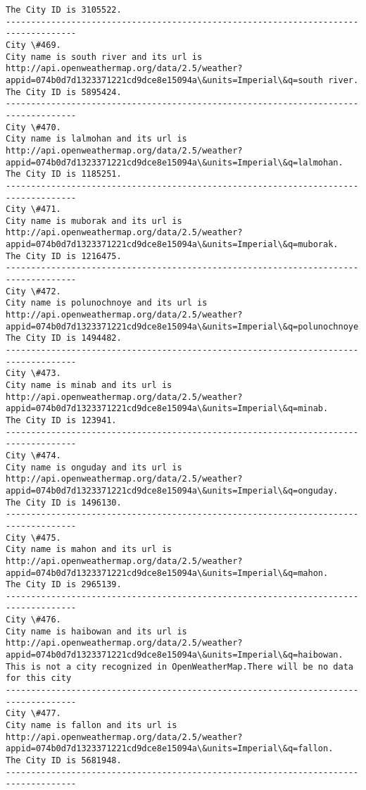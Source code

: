 \documentclass[11pt]{article}
\begin{document}
\begin{Verbatim}[commandchars=\\\{\}]
The City ID is 3105522.
------------------------------------------------------------------------------------
City \#469.
City name is south river and its url is http://api.openweathermap.org/data/2.5/weather?appid=074b0d7d1323371221cd9dce8e15094a\&units=Imperial\&q=south river.
The City ID is 5895424.
------------------------------------------------------------------------------------
City \#470.
City name is lalmohan and its url is http://api.openweathermap.org/data/2.5/weather?appid=074b0d7d1323371221cd9dce8e15094a\&units=Imperial\&q=lalmohan.
The City ID is 1185251.
------------------------------------------------------------------------------------
City \#471.
City name is muborak and its url is http://api.openweathermap.org/data/2.5/weather?appid=074b0d7d1323371221cd9dce8e15094a\&units=Imperial\&q=muborak.
The City ID is 1216475.
------------------------------------------------------------------------------------
City \#472.
City name is polunochnoye and its url is http://api.openweathermap.org/data/2.5/weather?appid=074b0d7d1323371221cd9dce8e15094a\&units=Imperial\&q=polunochnoye.
The City ID is 1494482.
------------------------------------------------------------------------------------
City \#473.
City name is minab and its url is http://api.openweathermap.org/data/2.5/weather?appid=074b0d7d1323371221cd9dce8e15094a\&units=Imperial\&q=minab.
The City ID is 123941.
------------------------------------------------------------------------------------
City \#474.
City name is onguday and its url is http://api.openweathermap.org/data/2.5/weather?appid=074b0d7d1323371221cd9dce8e15094a\&units=Imperial\&q=onguday.
The City ID is 1496130.
------------------------------------------------------------------------------------
City \#475.
City name is mahon and its url is http://api.openweathermap.org/data/2.5/weather?appid=074b0d7d1323371221cd9dce8e15094a\&units=Imperial\&q=mahon.
The City ID is 2965139.
------------------------------------------------------------------------------------
City \#476.
City name is haibowan and its url is http://api.openweathermap.org/data/2.5/weather?appid=074b0d7d1323371221cd9dce8e15094a\&units=Imperial\&q=haibowan.
This is not a city recognized in OpenWeatherMap.There will be no data for this city
------------------------------------------------------------------------------------
City \#477.
City name is fallon and its url is http://api.openweathermap.org/data/2.5/weather?appid=074b0d7d1323371221cd9dce8e15094a\&units=Imperial\&q=fallon.
The City ID is 5681948.
------------------------------------------------------------------------------------

\end{Verbatim}
\end{document}
